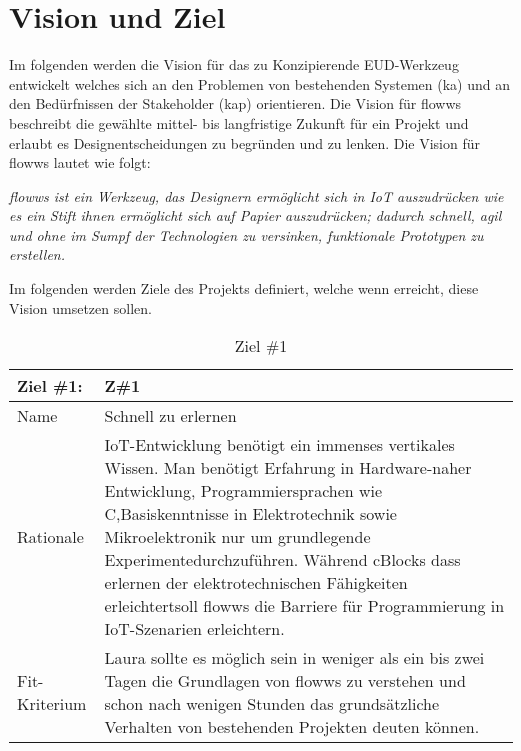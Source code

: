 \section{Vision und Ziel}
Im folgenden werden die Vision für das zu Konzipierende \ac{EUD}-Werkzeug entwickelt welches sich an den Problemen von bestehenden Systemen (ka) und an den Bedürfnissen der Stakeholder (kap) orientieren. Die Vision für flowws beschreibt die gewählte mittel- bis langfristige Zukunft für ein Projekt und erlaubt es Designentscheidungen zu begründen und zu lenken. Die Vision für flowws lautet wie folgt:

\textit{flowws ist ein Werkzeug, das Designern ermöglicht sich in \ac{IoT} auszudrücken wie es ein Stift ihnen ermöglicht sich auf Papier auszudrücken; dadurch schnell, agil und ohne im Sumpf der Technologien zu versinken, funktionale Prototypen zu erstellen.}

Im folgenden werden Ziele des Projekts definiert, welche wenn erreicht, diese Vision umsetzen sollen. 

\begin{table}[H]
\caption{Ziel \#1}
\label{tab:ziel1}
\begin{tabularx}{\textwidth}{lX}
\hline
\rowcolor[HTML]{EFEFEF} 
Ziel \#1:     & Z\#1   \\ \hline
Name          & Schnell zu erlernen \\ \hline
Rationale     & IoT-Entwicklung benötigt ein immenses vertikales Wissen. Man benötigt Erfahrung in Hardware-naher Entwicklung, Programmiersprachen wie C,Basiskenntnisse in Elektrotechnik sowie Mikroelektronik nur um grundlegende Experimentedurchzuführen. Während cBlocks dass erlernen der elektrotechnischen Fähigkeiten erleichtertsoll flowws die Barriere für Programmierung in IoT-Szenarien erleichtern. \\ \hline
Fit-Kriterium & Laura sollte es möglich sein in weniger als ein bis zwei Tagen die Grundlagen von flowws zu verstehen und schon nach wenigen Stunden das grundsätzliche Verhalten von bestehenden Projekten deuten können. \\ \hline
\end{tabularx}
\end{table}

